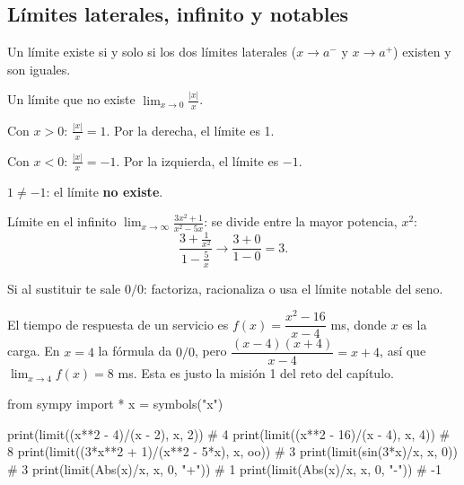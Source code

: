\subsection{L\'imites laterales, infinito y notables}
Un l\'imite existe si y solo si los dos l\'imites laterales ($x\to a^-$ y $x\to a^+$) existen y son iguales.

\begin{tmejemplo}{Un l\'imite que no existe}
$\displaystyle\lim_{x\to0}\frac{|x|}{x}$.
\begin{tmpasos}
\item Con $x>0$: $\frac{|x|}x=1$. Por la derecha, el l\'imite es 1.
\item Con $x<0$: $\frac{|x|}x=-1$. Por la izquierda, el l\'imite es $-1$.
\item $1\neq-1$: el l\'imite \textbf{no existe}.
\end{tmpasos}
\end{tmejemplo}

\begin{tmejemplo}{L\'imite en el infinito}
$\displaystyle\lim_{x\to\infty}\frac{3x^2+1}{x^2-5x}$: se divide entre la mayor potencia, $x^2$:
\[\frac{3+\frac1{x^2}}{1-\frac5x}\to\frac{3+0}{1-0}=3.\]
\end{tmejemplo}


\begin{tmtip}Si al sustituir te sale $0/0$: factoriza, racionaliza o usa el l\'imite notable del seno.\end{tmtip}

\begin{tmsistemas}
El tiempo de respuesta de un servicio es $f(x)=\dfrac{x^2-16}{x-4}$ ms, donde $x$ es la carga. En $x=4$ la f\'ormula da $0/0$, pero $\dfrac{(x-4)(x+4)}{x-4}=x+4$, as\'i que $\lim_{x\to4}f(x)=8$ ms. Esta es justo la misi\'on 1 del reto del cap\'itulo.
\end{tmsistemas}

\begin{tmcodigo}
from sympy import *
x = symbols("x")

print(limit((x**2 - 4)/(x - 2), x, 2))          # 4
print(limit((x**2 - 16)/(x - 4), x, 4))         # 8
print(limit((3*x**2 + 1)/(x**2 - 5*x), x, oo))  # 3
print(limit(sin(3*x)/x, x, 0))                  # 3
print(limit(Abs(x)/x, x, 0, "+"))               # 1
print(limit(Abs(x)/x, x, 0, "-"))               # -1
\end{tmcodigo}

